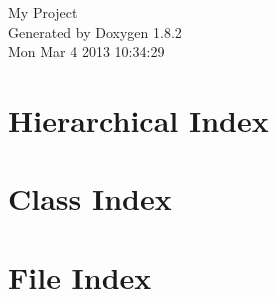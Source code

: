 \documentclass{book}
\begin{document}
\hypersetup{pageanchor=false,citecolor=blue}
\begin{titlepage}
\vspace*{7cm}
\begin{center}
{\Large My Project }\\
\vspace*{1cm}
{\large Generated by Doxygen 1.8.2}\\
\vspace*{0.5cm}
{\small Mon Mar 4 2013 10:34:29}\\
\end{center}
\end{titlepage}
\clearemptydoublepage
{}
\tableofcontents
\clearemptydoublepage
{}
\hypersetup{pageanchor=true,citecolor=blue}
\chapter{Hierarchical Index}

\chapter{Class Index}

\chapter{File Index}

\end{document}

